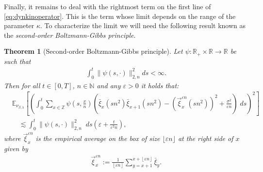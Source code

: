\documentclass[a4paper, reqno, 12pt]{amsart}
\theoremstyle{plain}
\newtheorem{theorem}[definition]{Theorem}
\theoremstyle{definition}
\newcommand{\floor}[1]{\left\lfloor #1 \right\rfloor}
\newcommand{\ee}[1]{\mathbb{E}_{\nu_{\beta,\lambda}}\left[ #1 \right]}
\newcommand{\R}{\mathbb{R}}
\newcommand{\Z}{\mathbb{Z}}
\newcommand{\N}{\mathbb{N}}
\begin{document}
Finally, it remains to deal with the rightmost term on the first line of \eqref{eq:dynkinoperator}.
This is the term whose limit depends on the range of the parameter $\kappa$. To characterize the limit we will need the following result known as the \emph{second-order Boltzmann-Gibbs principle}.
\begin{theorem}[Second-order Boltzmann-Gibbs principle] \label{thm:2ndboltzgibbs}
Let $\psi: \R_+\times \R\to \R$ be such that 
\begin{align*}
    \int_0^t \|\psi(s,\cdot)\|_{2,n}^2 ds < \infty.
\end{align*}
Then for all $t\in[0,T]$, $n\in\N$ and any $\varepsilon>0$ it holds that:
\begin{align*}
   & \ee{\left(\int_0^t \sum_{x\in\Z} \psi\left(s,\tfrac{x}{n}\right)\left(\bar{\xi}_x(sn^2)\bar{\xi}_{x+1}(sn^2) -\left(\overrightarrow{\xi}^{\varepsilon n}_x(sn^2)\right)^2 + \frac{\sigma^2}{\varepsilon n}\right) \;ds\right)^2 }\\&\quad \lesssim \int_0^t \|\psi(s,\cdot)\|_{2,n}^2\;  ds\left(\varepsilon +\frac{t}{\varepsilon^2 n} \right),
\end{align*}
where $\overrightarrow{\xi}_x^{\varepsilon n}$ is the empirical average on the box of size $\lfloor \varepsilon n \rfloor$ at the right side of $x$ given by  
\begin{align*}
    \overrightarrow{\xi}_x^{\varepsilon n} := \frac{1}{\floor{\varepsilon n}}\sum_{y = x+1}^{x+\floor{\varepsilon n}} \bar{\xi}_y.
\end{align*}
\end{theorem}
\end{document}
